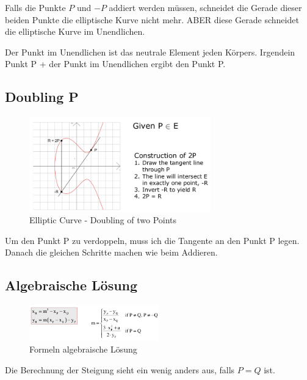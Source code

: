 Falls die Punkte $P$ und $-P$ addiert werden müssen, schneidet die Gerade dieser beiden Punkte die
elliptische Kurve nicht mehr. ABER diese Gerade schneidet die elliptische Kurve im Unendlichen.

\begin{tcolorbox}[colback=red!5!white,colframe=red!75!black]
Der Punkt im Unendlichen ist das neutrale Element jeden Körpers.
Irgendein Punkt P + der Punkt im Unendlichen ergibt den Punkt P.
\end{tcolorbox}

\hypertarget{doubling-p}{%
\subsection{Doubling P}\label{doubling-p}}

\begin{figure}[H]
\centering
\includegraphics[width=0.7\textwidth]{figures/doublePellipse.png}
\caption{Elliptic Curve - Doubling of two Points}
\end{figure}

Um den Punkt P zu verdoppeln, muss ich die Tangente an den Punkt P legen. Danach die
gleichen Schritte machen wie beim Addieren.

\hypertarget{algebraische-luxf6sung}{%
\subsection{Algebraische Lösung}\label{algebraische-luxf6sung}}

\begin{figure}[H]
\centering
\includegraphics[width=0.5\textwidth]{figures/algebraicSolutionEllipse.png}
\caption{Formeln algebraische Lösung}
\end{figure}

Die Berechnung der Steigung sieht ein wenig anders aus, falls $P = Q$ ist.

